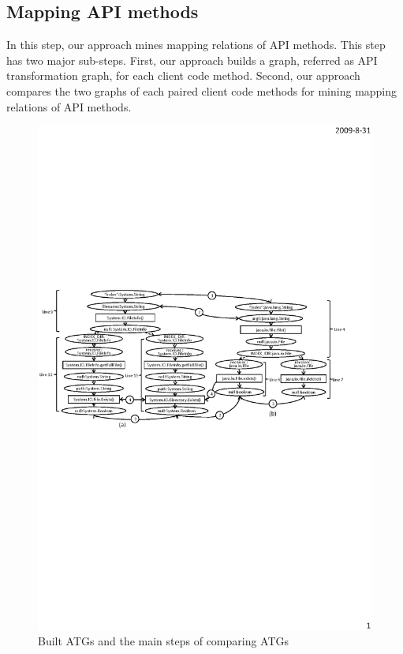 
\subsection{Mapping API methods}
\label{sec:approach:mappingtypes} 

In this step, our approach mines mapping relations of API methods. 
This step has two major sub-steps. First, our approach builds a graph, referred
as API transformation graph, for each client code
method. Second, our approach compares the two graphs of each paired
client code methods for mining mapping relations of API methods.

\begin{figure}[t]
\centering
\includegraphics[scale=1.1,clip]{figure/graph.eps}\vspace*{-3ex}
 \caption
{\label{fig:graph}Built ATGs and the main steps of comparing
ATGs}\vspace*{-3.5ex}
\end{figure}


